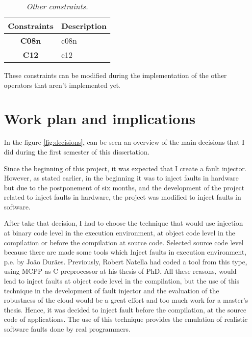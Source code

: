 \begin{table}[!ht]
\centering
\begin{tabular}{|c|p{12cm}|}
\hline
\textbf{Constraints}            & \multicolumn{1}{c|}{\textbf{Description}}                                     \\ \hline \hline
\textbf{C08n}         & \Acl{c08n} \\ \hline
\textbf{C12}         & \Acl{c12} \\ \hline
\end{tabular}
\caption{\small \sl Other constraints.\label{tab:otherConstraints}}
\end{table}

These constraints can be modified during the implementation of the other operators that aren't implemented yet.

\clearpage
\section{Work plan and implications}

In the figure \ref{fig:decisions}, can be seen an overview of the main decisions that I did during the first semester of this dissertation.

Since the beginning of this project, it was expected that I create a fault injector. However, as stated earlier, in the beginning it was to inject faults in hardware but due to the postponement of six months, and the development of the project related to inject faults in hardware, the project was modified to inject faults in software.

After take that decision, I had to choose the technique that would use injection at binary code level in the execution environment, at object code level in the compilation or before the compilation at source code. Selected source code level because there are made some tools which Inject faults in execution environment, p.e. by João Durães. Previously, Robert Natella had coded a tool from this type, using MCPP as C preprocessor at his thesis of PhD.
All these reasons, would lead to inject faults at object code level in the compilation, but the use of this technique in the development of fault injector and the evaluation of the robustness of the cloud would be a great effort and too much work for a master's thesis. Hence, it was decided to inject fault before the compilation, at the source code of applications. The use of this technique provides the emulation of realistic software faults done by real programmers.


